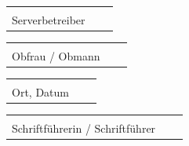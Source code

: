 \documentclass[parskip=half]{scrreprt}
\begin{document}
\begin{tabular}{p{7cm}p{0.5cm}l}
\dotfill \\
Serverbetreiber
\end{tabular}
\hfill
\begin{tabular}{p{7cm}p{0.5cm}l}
\dotfill \\
Obfrau /  Obmann
\end{tabular}

\vspace{1cm}
\begin{tabular}{p{7cm}p{0.5cm}l}
\dotfill \\
Ort, Datum
\end{tabular}
\hfill
\begin{tabular}{p{7cm}p{0.5cm}l}
\dotfill \\
Schriftführerin / Schriftführer
\end{tabular}


\end{document}

